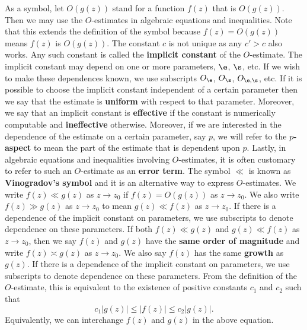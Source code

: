         As a symbol, let $O(g(z))$ stand for a function $f(z)$ that is $O(g(z))$. Then we may use the $O$-estimates in algebraic equations and inequalities. Note that this extends the definition of the symbol because $f(z) = O(g(z))$ means $f(z)$ is $O(g(z))$. The constant $c$ is not unique as any $c' > c$ also works. Any such constant is called the \textbf{implicit constant} of the $O$-estimate. The implicit constant may depend on one or more parameters, $\e$, $\s$, etc. If we wish to make these dependences known, we use subscripts $O_{\e}$, $O_{\s}$, $O_{\e,\s}$, etc. If it is possible to choose the implicit constant independent of a certain parameter then we say that the estimate is \textbf{uniform} with respect to that parameter. Moreover, we say that an implicit constant is \textbf{effective} if the constant is numerically computable and \textbf{ineffective} otherwise. Moreover, if we are interested in the dependence of the estimate on a certain parameter, say $p$, we will refer to the \textbf{$p$-aspect} to mean the part of the estimate that is dependent upon $p$. Lastly, in algebraic equations and inequalities involving $O$-estimates, it is often customary to refer to such an $O$-estimate as an \textbf{error term}. The symbol $\ll$ is known as \textbf{Vinogradov's symbol} and it is an alternative way to express $O$-estimates. We write $f(z) \ll g(z)$ as $z \to z_{0}$ if $f(z) = O(g(z))$ as $z \to z_{0}$. We also write $f(z) \gg g(z)$ as $z \to z_{0}$ to mean $g(z) \ll f(z)$ as $z \to z_{0}$. If there is a dependence of the implicit constant on parameters, we use subscripts to denote dependence on these parameters. If both $f(z) \ll g(z)$ and $g(z) \ll f(z)$ as $z \to z_{0}$, then we say $f(z)$ and $g(z)$ have the \textbf{same order of magnitude} and write $f(z) \asymp g(z)$ as $z \to z_{0}$. We also say $f(z)$ has the same \textbf{growth} as $g(z)$. If there is a dependence of the implicit constant on parameters, we use subscripts to denote dependence on these parameters. From the definition of the $O$-estimate, this is equivalent to the existence of positive constants $c_{1}$ and $c_{2}$ such that
        \[
          c_{1}|g(z)| \le |f(z)| \le c_{2}|g(z)|.
        \]
        Equivalently, we can interchange $f(z)$ and $g(z)$ in the above equation.
